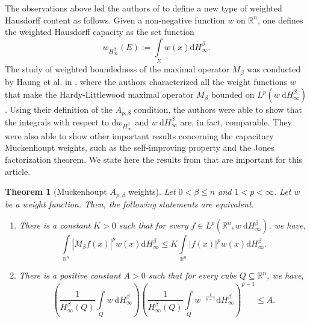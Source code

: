 \documentclass{amsart}
\newtheorem{theorem}{Theorem}
\numberwithin{theorem}{section}
\numberwithin{equation}{section}
\begin{document}
		The observations above led the authors of \cite{Huang} to define a new type of weighted Hausdorff content as follows. Given a non-negative function $w$ on $\mathbb{R}^n$, one defines the weighted Hausdorff capacity as the set function
		\begin{equation}
			\label{WeightedCapacity}
			w_{H^{\beta}_{\infty}} \left( E \right) := \int\limits_{E} w \left( x \right) \mathrm{d}H^{\beta}_{\infty}.
		\end{equation}
		 The study of weighted boundedness of the maximal operator $M_{\beta}$ was conducted by Haung et al. in \cite{Huang}, where the authors characterized all the weight functions $w$ that make the Hardy-Littlewood maximal operator $M_{\beta}$ bounded on $L^p \left( w \ \mathrm{d}H^{\beta}_{\infty} \right)$. Using their definition of the $A_{p, \beta}$ condition, the authors were able to show that the integrals with respect to $\mathrm{d}w_{H^{\beta}_{\infty}}$ and $w \ \mathrm{d}H^{\beta}_{\infty}$ are, in fact, comparable. They were also able to show other important results concerning the capacitary Muckenhoupt weights, such as the self-improving property and the Jones factorization theorem. We state here the results from \cite{Huang} that are important for this article.
		\begin{theorem}[Muckenhoupt $A_{p, \beta}$ weights]
			\label{ApWeightsTheorem}
			Let $0 < \beta \leq n$ and $1 < p < \infty$. Let $w$ be a weight function. Then, the following statements are equivalent.
			\begin{enumerate}
				\item There is a constant $K > 0$ such that for every $f \in L^p \left( \mathbb{R}^n, w \ \mathrm{d}H^{\beta}_{\infty} \right)$, we have,
				\begin{equation}
					\label{StrongPPInequality}
					\int\limits_{\mathbb{R}^n} \left| M_{\beta}f \left( x \right) \right|^p w \left( x \right) \mathrm{d}H^{\beta}_{\infty} \leq K \int\limits_{\mathbb{R}^n} \left| f \left( x \right) \right|^p w \left( x \right) \mathrm{d}H^{\beta}_{\infty}.
				\end{equation}
				\item There is a positive constant $A > 0$ such that for every cube $Q \subseteq \mathbb{R}^n$, we have,
				\begin{equation}
					\label{ApCondition}
					\left( \frac{1}{H^{\beta}_{\infty} \left( Q \right)} \int\limits_{Q} w \ \mathrm{d}H^{\beta}_{\infty} \right) \left( \frac{1}{H^{\beta}_{\infty} \left( Q \right)} \int\limits_{Q} w^{- \frac{1}{p - 1}} \mathrm{d}H^{\beta}_{\infty} \right)^{p - 1} \leq A.
				\end{equation}
			\end{enumerate}
		\end{theorem}
\end{document}
